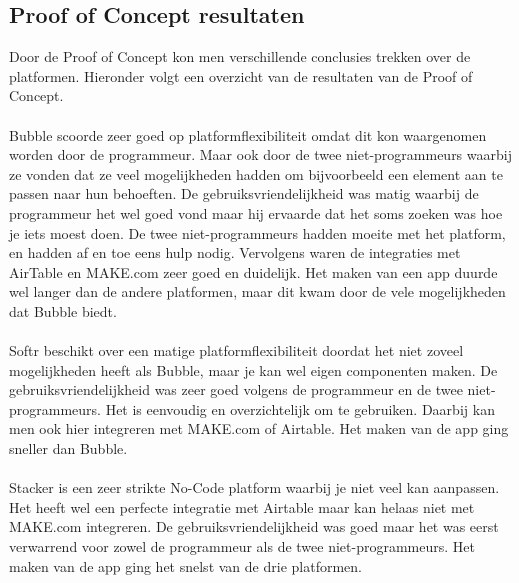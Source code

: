 \subsection{Proof of Concept resultaten}%
\label{subsec:proof-of-concept-resultaten}
Door de Proof of Concept kon men verschillende conclusies trekken over de platformen. Hieronder volgt een overzicht van de resultaten van de Proof of Concept.
\\
\\
Bubble scoorde zeer goed op platformflexibiliteit omdat dit kon waargenomen worden door de programmeur. Maar ook door de twee niet-programmeurs waarbij ze vonden dat ze veel mogelijkheden hadden om bijvoorbeeld een element aan te passen 
naar hun behoeften. De gebruiksvriendelijkheid was matig waarbij de programmeur het wel goed vond maar hij ervaarde dat het soms zoeken was hoe je iets moest doen. De twee niet-programmeurs hadden moeite met het platform, en hadden af en toe eens hulp nodig. Vervolgens 
waren de integraties met AirTable en MAKE.com zeer goed en duidelijk. Het maken van een app duurde wel langer dan de andere platformen, maar dit kwam door de vele mogelijkheden dat Bubble biedt.
\\
\\
Softr beschikt over een matige platformflexibiliteit doordat het niet zoveel mogelijkheden heeft als Bubble, maar je kan wel eigen componenten maken. De gebruiksvriendelijkheid was zeer goed volgens de programmeur en de twee niet-programmeurs. Het is eenvoudig en overzichtelijk om te gebruiken.
Daarbij kan men ook hier integreren met MAKE.com of Airtable. Het maken van de app ging sneller dan Bubble.
\\
\\
Stacker is een zeer strikte No-Code platform waarbij je niet veel kan aanpassen. Het heeft wel een perfecte integratie met Airtable maar kan helaas niet met MAKE.com integreren.
De gebruiksvriendelijkheid was goed maar het was eerst verwarrend voor zowel de programmeur als de twee niet-programmeurs. Het maken van de app ging het snelst van de drie platformen.
